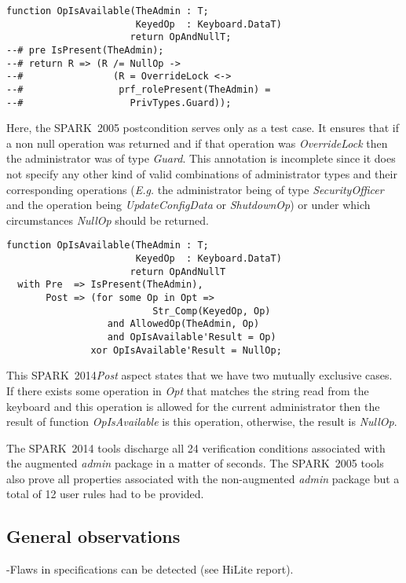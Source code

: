\documentclass[10pt,a4paper,twocolumn]{article}
\newcommand{\oldspark}{SPARK~2005\xspace}
\newcommand{\newspark}{SPARK~2014\xspace}
\newcommand{\Eg}{\textit{E.g.}\xspace}
\begin{document}
\begin{lstlisting}[caption=\oldspark]
function OpIsAvailable(TheAdmin : T;
                       KeyedOp  : Keyboard.DataT)
                      return OpAndNullT;
--# pre IsPresent(TheAdmin);
--# return R => (R /= NullOp ->
--#                (R = OverrideLock <->
--#                 prf_rolePresent(TheAdmin) =
--#                   PrivTypes.Guard));
\end{lstlisting}
Here, the \oldspark postcondition serves only as a test case. It
ensures that if a non null operation was returned and if that
operation was \emph{OverrideLock} then the administrator was of type
\emph{Guard}. This annotation is incomplete since it does not specify
any other kind of valid combinations of administrator types and their
corresponding operations (\Eg the administrator being of type
\emph{SecurityOfficer} and the operation being \emph{UpdateConfigData}
or \emph{ShutdownOp}) or under which circumstances \emph{NullOp}
should be returned.

\begin{lstlisting}[caption=\newspark]
function OpIsAvailable(TheAdmin : T;
                       KeyedOp  : Keyboard.DataT)
                      return OpAndNullT
  with Pre  => IsPresent(TheAdmin),
       Post => (for some Op in Opt =>
                          Str_Comp(KeyedOp, Op)
                  and AllowedOp(TheAdmin, Op)
                  and OpIsAvailable'Result = Op)
               xor OpIsAvailable'Result = NullOp;
\end{lstlisting}
This \newspark \emph{Post} aspect states that we have two mutually
exclusive cases. If there exists some operation in \emph{Opt} that
matches the string read from the keyboard and this operation is
allowed for the current administrator then the result of function
\emph{OpIsAvailable} is this operation, otherwise, the result is
\emph{NullOp}.

The \newspark tools discharge all 24 verification conditions
associated with the augmented \emph{admin} package in a matter of
seconds. The \oldspark tools also prove all properties associated with
the non-augmented \emph{admin} package but a total of 12 user rules had
to be provided.

\subsection{General observations}

-Flaws in specifications can be detected (see HiLite report).
\end{document}
